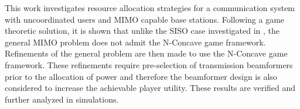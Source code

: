This work investigates resource allocation strategies for a communication system with uncoordinated users and MIMO capable base stations. Following a game theoretic solution, it is shown that unlike the SISO case investigated in \cite{ghosh2015normalized}, the general MIMO problem does not admit the N-Concave game framework. Refinements of the general problem are then made to use the N-Concave game framework. These refinements require pre-selection of transmission beamformers prior to the allocation of power and therefore the beamformer design is also considered to increase the achievable player utility. These results are verified and further analyzed in simulations.